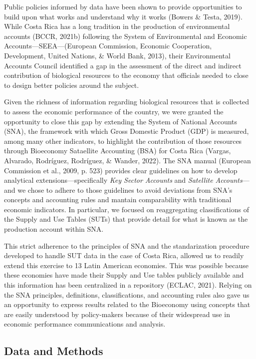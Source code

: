 \documentclass[
  letterpaper,
  DIV=11,
  numbers=noendperiod]{scrartcl}
\begin{document}
Public policies informed by data have been shown to provide
opportunities to build upon what works and understand why it works
(Bowers \& Testa, 2019). While Costa Rica has a long tradition in the
production of environmental accounts (BCCR, 2021b) following the System
of Environmental and Economic Accounts---SEEA---(European Commission,
Economic Cooperation, Development, United Nations, \& World Bank, 2013),
their Environmental Accounts Council identified a gap in the assessment
of the direct and indirect contribution of biological resources to the
economy that officials needed to close to design better policies around
the subject.

Given the richness of information regarding biological resources that is
collected to assess the economic performance of the country, we were
granted the opportunity to close this gap by extending the System of
National Accounts (SNA), the framework with which Gross Domestic Product
(GDP) is measured, among many other indicators, to highlight the
contribution of those resources through Bioeconomy Sataellite Accounting
(BSA) for Costa Rica (Vargas, Alvarado, Rodríguez, Rodríguez, \& Wander,
2022). The SNA manual (European Commission et al., 2009, p. 523)
provides clear guidelines on how to develop analytical
extensions---specifically \emph{Key Sector Accounts} and \emph{Satellite
Accounts}---and we chose to adhere to those guidelines to avoid
deviations from SNA's concepts and accounting rules and mantain
comparability with traditional economic indicators. In particular, we
focused on reaggregating classifications of the Supply and Use Tables
(SUTs) that provide detail for what is known as the production account
within SNA.

This strict adherence to the principles of SNA and the standarization
procedure developed to handle SUT data in the case of Costa Rica,
allowed us to readily extend this exercise to 13 Latin American
economies. This was possible because these economies have made their
Supply and Use tables publicly available and this information has been
centralized in a repository (ECLAC, 2021). Relying on the SNA
principles, definitions, classifications, and accounting rules also gave
us an opportunity to express results related to the Bioeconomy using
concepts that are easily understood by policy-makers because of their
widespread use in economic performance communications and analysis.

\subsection{Data and Methods}\label{data-and-methods}
\end{document}
